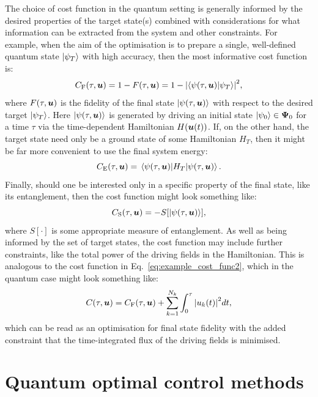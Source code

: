 The choice of cost function in the quantum setting is generally informed by the desired properties of the target state(s) combined with considerations for what information can be extracted from the system and other constraints. For example, when the aim of the optimisation is to prepare a single, well-defined quantum state $\ket{\psi_T}$ with high accuracy, then the most informative cost function is:
\begin{equation}\label{eq:costfunc_fidelity}
    C_{\rm F}(\tau, \boldsymbol{u}) = 1 - F(\tau, \boldsymbol{u}) = 1 - \abs{\braket{\psi(\tau, \boldsymbol{u})}{\psi_T}}^2,
\end{equation}
where $F(\tau, \boldsymbol{u})$ is the fidelity of the final state $\ket{\psi(\tau, \boldsymbol{u})}$ with respect to the desired target $\ket{\psi_T}$. Here $\ket{\psi(\tau, \boldsymbol{u})}$ is generated by driving an initial state $\ket{\psi_0} \in \boldsymbol \Psi_0$ for a time $\tau$ via the time-dependent Hamiltonian $H(\boldsymbol{u}(t))$. If, on the other hand, the target state need only be a ground state of some Hamiltonian $H_T$, then it might be far more convenient to use the final system energy:
\begin{equation}\label{eq:costfunc_energy}
    C_{\rm E}(\tau, \boldsymbol{u}) = \mel{\psi(\tau, \boldsymbol{u})}{H_T}{\psi(\tau, \boldsymbol{u})}.
\end{equation}
Finally, should one be interested only in a specific property of the final state, like its entanglement, then the cost function might look something like:
\begin{equation}\label{eq:costfunc_entanglement}
    C_{\rm S}(\tau, \boldsymbol{u}) = -S[\ket{\psi(\tau, \boldsymbol{u})}],
\end{equation}
where $S[\cdot]$ is some appropriate measure of entanglement. As well as being informed by the set of target states, the cost function may include further constraints, like the total power of the driving fields in the Hamiltonian. This is analogous to the cost function in Eq.~\eqref{eq:example_cost_func2}, which in the quantum case might look something like:
\begin{equation}\label{eq:costfunc_constraint}
    C(\tau, \boldsymbol{u}) = C_{\rm F}(\tau, \boldsymbol{u}) + \sum_{k = 1}^{N_k} \int_0^{\tau} \abs{u_k(t)}^2 dt,
\end{equation}
which can be read as an optimisation for final state fidelity with the added constraint that the time-integrated flux of the driving fields is minimised. 

\section{Quantum optimal control methods}\label{sec:3.3_qoct_methods}

